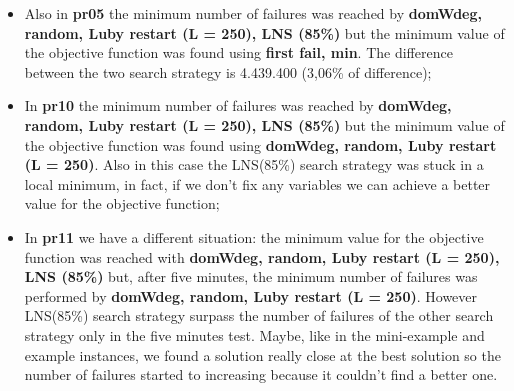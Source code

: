\begin{itemize}
    \item Also in \textbf{pr05} the minimum number of failures was reached by \textbf{domWdeg, random, Luby restart (L = 250), LNS (85\%)} but the minimum value of the objective function was found using \textbf{first fail, min}. The difference between the two search strategy is 4.439.400 (3,06\% of difference);
    \item In \textbf{pr10} the minimum number of failures was reached by \textbf{domWdeg, random, Luby restart (L = 250), LNS (85\%)} but the minimum value of the objective function was found using \textbf{domWdeg, random, Luby restart (L = 250)}. Also in this case the LNS(85\%) search strategy was stuck in a local minimum, in fact, if we don't fix any variables we can achieve a better value for the objective function;
    \item In \textbf{pr11} we have a different situation: the minimum value for the objective function was reached with \textbf{domWdeg, random, Luby restart (L = 250), LNS (85\%)} but, after five minutes, the minimum number of failures was performed by \textbf{domWdeg, random, Luby restart (L = 250)}. However LNS(85\%) search strategy surpass the number of failures of the other search strategy  only in the five minutes test. Maybe, like in the mini-example and example instances, we found a solution really close at the best solution so the number of failures started to increasing because it couldn't find a better one. 
\end{itemize}
